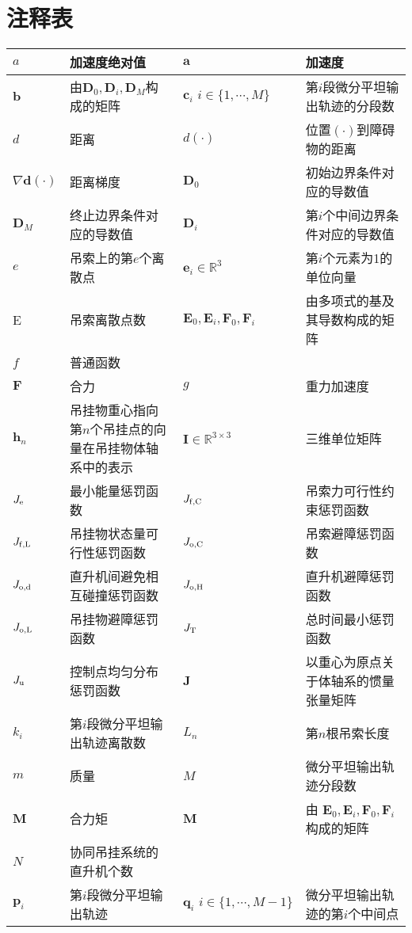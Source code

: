 
\chapter*{注释表}

\noindent\begin{tabu} to \hline
$a$ & 加速度绝对值 & $\boldsymbol{a}$ & 加速度 \\ \hline
$\boldsymbol{b}$ & 由$\boldsymbol{D}_0, \boldsymbol{D}_i, \boldsymbol{D}_M$构成的矩阵 & $\boldsymbol{c}_i \,\, i\in\{1,\cdots,M\}$ & 第$i$段微分平坦输出轨迹的分段数 \\ \hline
$d$ & 距离 & $d(\cdot)$ & 位置$(\cdot)$到障碍物的距离 \\ \hline
$\nabla  \boldsymbol{d}(\cdot)$ & 距离梯度 & $\boldsymbol{D}_0$ & 初始边界条件对应的导数值 \\ \hline
$\boldsymbol{D}_{M}$ & 终止边界条件对应的导数值 & $\boldsymbol{D}_i$ & 第$i$个中间边界条件对应的导数值 \\ \hline
$e$ & 吊索上的第$e$个离散点 & $\boldsymbol{e}_i \in \mathbb{R}^3$ & 第$i$个元素为1的单位向量  \\ \hline
E & 吊索离散点数 & $\boldsymbol{E}_0, \boldsymbol{E}_i, \boldsymbol{F}_0, \boldsymbol{F}_i$ & 由多项式的基及其导数构成的矩阵 \\ \hline
$f$ & 普通函数 & & \\ \hline
$\boldsymbol{F}$ & 合力 & $g$ & 重力加速度 \\ \hline
$\boldsymbol{h}_n $ & 吊挂物重心指向第$n$个吊挂点的向量在吊挂物体轴系中的表示 &
$\boldsymbol{I}\in \mathbb{R}^{3 \times 3}$ & 三维单位矩阵 \\ \hline
$J_{\rm{e}}$ & 最小能量惩罚函数 & $J_{\rm{f,C}}$ & 吊索力可行性约束惩罚函数 \\ \hline
$J_{\rm{f,L}}$ & 吊挂物状态量可行性惩罚函数 & $J_{\rm{o,C}}$ & 吊索避障惩罚函数 \\ \hline
$J_{\rm{o,d}}$ & 直升机间避免相互碰撞惩罚函数 &  $J_{\rm{o,H}}$ & 直升机避障惩罚函数 \\ \hline
$J_{\rm{o,L}}$ & 吊挂物避障惩罚函数 & $J_{\rm{T}}$ & 总时间最小惩罚函数  \\ \hline
$J_{\rm{u}}$ &控制点均匀分布惩罚函数 & $\boldsymbol{J}$ & 以重心为原点关于体轴系的惯量张量矩阵 \\ \hline
$k_i$ & 第$i$段微分平坦输出轨迹离散数 & $L_n$ & 第$n$根吊索长度  \\ \hline
$m$ & 质量 & $M$ & 微分平坦输出轨迹分段数 \\ \hline
$\boldsymbol{M}$ & 合力矩 & $\boldsymbol{M}$ & 由 $\boldsymbol{E}_0, \boldsymbol{E}_i, \boldsymbol{F}_0, \boldsymbol{F}_i$构成的矩阵 \\ \hline
$N$ & 协同吊挂系统的直升机个数 & & \\ \hline
$\boldsymbol{p}_i$ & 第$i$段微分平坦输出轨迹 & $\boldsymbol{q}_i \,\, i\in\{1,\cdots,M-1\}$ & 微分平坦输出轨迹的第$i$个中间点 \\ \hline
\end{tabu}

